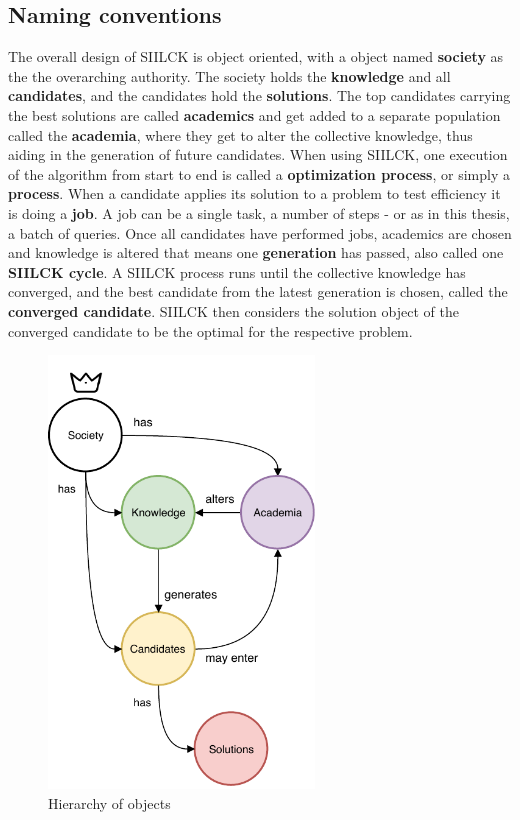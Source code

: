 \documentclass[a4paper,english]{report}
\begin{document}
		\subsection{Naming conventions}
		The overall design of SIILCK is object oriented, with a object named  \textbf{society} as the the overarching authority. The society holds the \textbf{knowledge} and all \textbf{candidates}, and the candidates hold the \textbf{solutions}. The top candidates carrying the best solutions are called \textbf{academics} and get added to a separate population called the \textbf{academia}, where they get to alter the collective knowledge, thus aiding in the generation of future candidates. When using SIILCK, one execution of the algorithm from start to end is called a \textbf{optimization process}, or simply a \textbf{process}. When a candidate applies its solution to a problem to test efficiency it is doing a \textbf{job}. A job can be a single task, a number of steps - or as in this thesis, a batch of queries. Once all candidates have performed jobs, academics are chosen and knowledge is altered that means one \textbf{generation} has passed, also called one \textbf{SIILCK cycle}. A SIILCK process runs until the collective knowledge has converged, and the best candidate from the latest generation is chosen, called the \textbf{converged candidate}. SIILCK then considers the solution object of the converged candidate to be the optimal for the respective problem. 
		\begin{figure}[H]
			\centering
			\includegraphics[width=200pt]{OOP}
			\caption{Hierarchy of objects}
		\end{figure}
\end{document}
